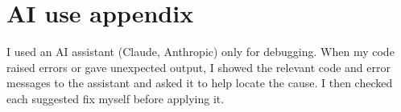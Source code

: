 \documentclass[11pt]{article}
\begin{document}
\section*{AI use appendix}
I used an AI assistant (Claude, Anthropic) only for debugging.
When my code raised errors or gave unexpected output, I showed the relevant code and error messages to the assistant and asked it to help locate the cause.
I then checked each suggested fix myself before applying it.
\end{document}
